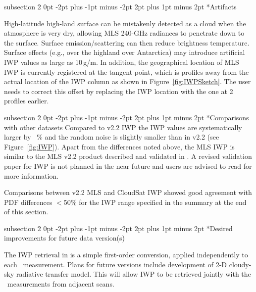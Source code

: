 \documentclass[11pt,draft]{report}
\makeatletter
\renewcommand{\subsection}{\@startsection%
  {subsection}%
  {2}%
  {0pt}%
  {-2pt plus -1pt minus -2pt}%
  {2pt plus 1pt minus 2pt}%
  {\large\sffamily\fontseries{sb}\selectfont\flushleft\color{SectionColor}\figureversion{tabular}}}%
\makeatother
\begin{document}
\subsection*{Artifacts}

High-latitude high-land surface can be mistakenly detected as a cloud
when the atmosphere is very dry, allowing MLS 240-GHz radiances to
penetrate down to the surface.  Surface emission/scattering can then
reduce brightness temperature. Surface effects (e.g., over the highland
over Antarctica) may introduce artificial IWP values as large as
10\,g/m.  In addition, the geographical location of MLS IWP is
currently registered at the tangent point, which is  profiles
away from the actual location of the IWP column as shown in
Figure~\ref{fig:IWPSketch}. The user needs to correct this offset by
replacing the IWP location with the one at 2 profiles earlier.

\subsection*{Comparisons with other datasets}
Compared to v2.2 IWP the \thisv IWP values are systematically larger by
~\% and the random noise is slightly smaller than in v2.2 (see
Figure~\ref{fig:IWP}).  Apart from the differences noted above, the MLS
\thisv IWP is similar to the MLS v2.2 product described and validated in
\citet{WuEtal09}.  A revised validation paper for IWP is not planned in
the near future and users are advised to read \citet{WuEtal09} for more
information.

Comparisons between v2.2 MLS and CloudSat IWP showed good agreement with PDF
differences $<$50\% for the IWP range specified in the summary at the end
of this section.  

\subsection*{Desired improvements for future data version(s)}

The IWP retrieval in \thisv is a simple first-order conversion, applied
independently to each \Tcir\ measurement. Plans for future versions
include development of 2-D cloudy-sky radiative transfer model.  This
will allow IWP to be retrieved jointly with the \Tcir\ measurements
from adjacent scans.
\end{document}
